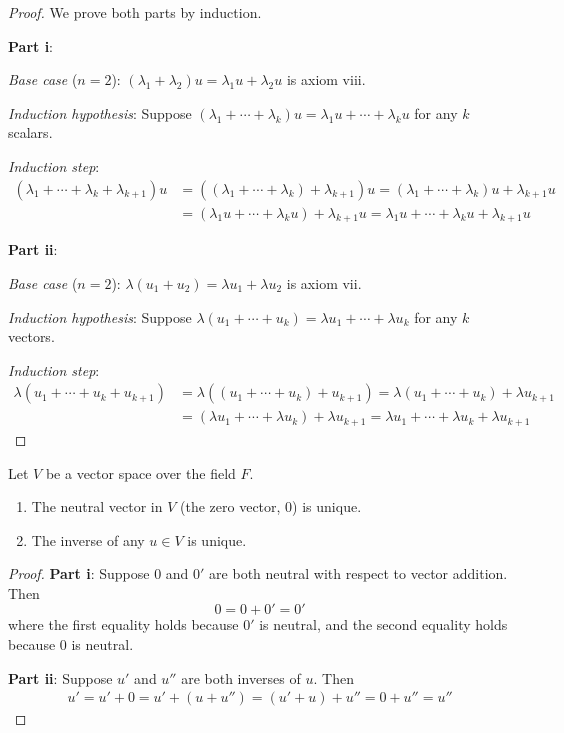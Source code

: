 \begin{proof}
    We prove both parts by induction.
    
    \textbf{Part i}:
    
    \textit{Base case} ($n = 2$): $(\lambda_1 + \lambda_2)u = \lambda_1 u + \lambda_2 u$ is axiom viii.
    
    \textit{Induction hypothesis}: Suppose $(\lambda_1 + \cdots + \lambda_k)u = \lambda_1 u + \cdots + \lambda_k u$ for any $k$ scalars.
    
    \textit{Induction step}:
    \begin{align*}
        (\lambda_1 + \cdots + \lambda_k + \lambda_{k+1})u &= ((\lambda_1 + \cdots + \lambda_k) + \lambda_{k+1})u = (\lambda_1 + \cdots + \lambda_k)u + \lambda_{k+1}u \\
        &= (\lambda_1 u + \cdots + \lambda_k u) + \lambda_{k+1}u = \lambda_1 u + \cdots + \lambda_k u + \lambda_{k+1}u
    \end{align*}
    
    \textbf{Part ii}:
    
    \textit{Base case} ($n = 2$): $\lambda(u_1 + u_2) = \lambda u_1 + \lambda u_2$ is axiom vii.
    
    \textit{Induction hypothesis}: Suppose $\lambda(u_1 + \cdots + u_k) = \lambda u_1 + \cdots + \lambda u_k$ for any $k$ vectors.
    
    \textit{Induction step}:
    \begin{align*}
        \lambda(u_1 + \cdots + u_k + u_{k+1}) &= \lambda((u_1 + \cdots + u_k) + u_{k+1}) = \lambda(u_1 + \cdots + u_k) + \lambda u_{k+1} \\
        &= (\lambda u_1 + \cdots + \lambda u_k) + \lambda u_{k+1} = \lambda u_1 + \cdots + \lambda u_k + \lambda u_{k+1}
    \end{align*}
\end{proof}

\begin{theorem}[Uniqueness]\label{thm:uniqueness}
    Let $V$ be a vector space over the field $F$.
    \begin{enumerate}[label=\roman*.]
        \item The neutral vector in $V$ (the zero vector, $0$) is unique.
        \item The inverse of any $u \in V$ is unique.
    \end{enumerate}
\end{theorem}

\begin{proof}
    \textbf{Part i}: Suppose $0$ and $0'$ are both neutral with respect to vector addition. Then
    \[
    0 = 0 + 0' = 0'
    \]
    where the first equality holds because $0'$ is neutral, and the second equality holds because $0$ is neutral.
    
    \textbf{Part ii}: Suppose $u'$ and $u''$ are both inverses of $u$. Then
    \begin{align*}
        u' = u' + 0 = u' + (u + u'') = (u' + u) + u'' = 0 + u'' = u''
    \end{align*}
\end{proof}

